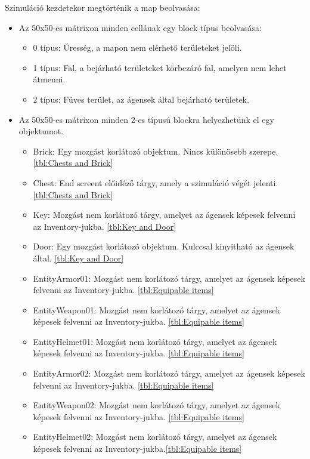 Szimuláció kezdetekor megtörténik a map beolvasása:

\begin{itemize}
    \item Az 50x50-es mátrixon minden cellának egy block típus beolvasása:
    
    \begin{itemize}
        \item 0 típus: Üresség, a mapon nem elérhető területeket jelöli.
        \item 1 típus: Fal, a bejárható területeket körbezáró fal, amelyen nem lehet átmenni.
        \item 2 típus: Füves terület, az ágensek által bejárható területek.
    \end{itemize}

    \item Az 50x50-es mátrixon minden 2-es típusú blockra helyezhetünk el egy objektumot.
    
    \begin{itemize}
        \item Brick: Egy mozgást korlátozó objektum. Nincs különösebb szerepe. \ref{tbl:Chests and Brick}
        \item Chest: End screent előidéző tárgy, amely a szimuláció végét jelenti. \ref{tbl:Chests and Brick}
        \item Key: Mozgást nem korlátozó tárgy, amelyet az ágensek képesek felvenni az Inventory-jukba. \ref{tbl:Key and Door}
        \item Door: Egy mozgást korlátozó objektum. Kulccsal kinyitható az ágensek által. \ref{tbl:Key and Door}
        \item EntityArmor01: Mozgást nem korlátozó tárgy, amelyet az ágensek képesek felvenni az Inventory-jukba. \ref{tbl:Equipable items}
        \item EntityWeapon01: Mozgást nem korlátozó tárgy, amelyet az ágensek képesek felvenni az Inventory-jukba. \ref{tbl:Equipable items}
        \item EntityHelmet01: Mozgást nem korlátozó tárgy, amelyet az ágensek képesek felvenni az Inventory-jukba. \ref{tbl:Equipable items}
        \item EntityArmor02: Mozgást nem korlátozó tárgy, amelyet az ágensek képesek felvenni az Inventory-jukba. \ref{tbl:Equipable items}
        \item EntityWeapon02: Mozgást nem korlátozó tárgy, amelyet az ágensek képesek felvenni az Inventory-jukba. \ref{tbl:Equipable items}
        \item EntityHelmet02: Mozgást nem korlátozó tárgy, amelyet az ágensek képesek felvenni az Inventory-jukba.\ref{tbl:Equipable items}


\end{itemize}
\end{itemize}
